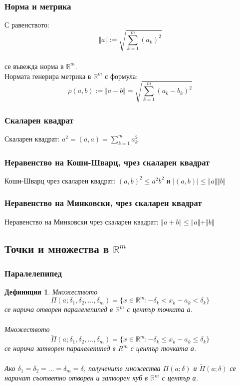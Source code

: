 \documentclass[a4paper,fleqn,12pt]{article}
\newtheorem{definition}{Дефиниция}[subsection]
\theoremstyle{definition}
\begin{document}
\subsubsection{Норма и метрика}
С равенството:
$$\Vert a\Vert := \sqrt{ \sum_{k=1}^{m}(a_k)^2  }$$ \\
се въвежда норма в $\mathbb{R}^m$.
\\
 Нормата генерира метрика в $\mathbb{R}^m$ с формула: 
$$\rho(a,b) := \Vert a-b\Vert = \sqrt{ \sum_{k=1}^{m} (a_k - b_k)^2} $$

\subsubsection{Скаларен квадрат}
Скаларен квадрат: $a^2 = (a,a) = \sum _{k=1}^{m}a_k^2$

\subsubsection{Неравенство на Коши-Шварц, чрез скаларен квадрат}
Коши-Шварц чрез скаларен квадрат: $(a,b)^2 \leq a^2b^2$ и $\vert (a,b)\vert \leq \Vert a \Vert \Vert b \Vert$

\subsubsection{Неравенство на Минковски, чрез скаларен квадрат}
Неравенство на Минковски чрез скаларен квадрат: $\Vert a+b \Vert\leq \Vert a \Vert + \Vert b \Vert$

\subsection{Точки и множества в $\mathbb{R}^m$}

\subsubsection{Паралелепипед}

\begin{definition}
Множеството\\
$$\Pi (a; \delta_1, \delta_2, ... ,\delta_m) = \{ x \in \mathbb{R}^m: -\delta_k < x_k -a_k < \delta_k   \}$$
се нарича отворен паралелепипед в $\mathbb{R}^m$ с център точката а.\\
\\
Множеството\\
$$\widetilde\Pi (a; \delta_1, \delta_2, ... ,\delta_m) = \{ x \in\mathbb{R}^m: -\delta_k \leq x_k -a_k \leq \delta_k   \}$$
се нарича затворен паралелепипед в $R^m$ с център точката а.\\
\\
Ако $\delta_1 = \delta_2 = ... = \delta_m = \delta$, получените множества $\Pi (a; \delta)$ и $\widetilde\Pi (a; \delta)$ се  наричат съответно отворен и затворен куб в $\mathbb{R}^m$ с център а.
 \end{definition}
\end{document}

